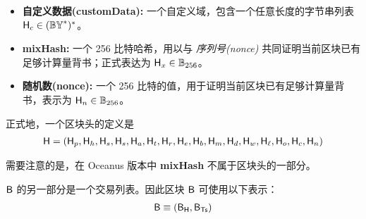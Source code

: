 \begin{itemize}[nosep]
	\item {\bf 自定义数据(customData):} 一个自定义域，包含一个任意长度的字节串列表 $\textsf{H}_c\in (\mathbb{BY}^*)^*$。

	\item {\bf mixHash:} 一个 256 比特哈希，用以与 \emph{序列号(nonce)} 共同证明当前区块已有足够计算量背书；正式表达为 $\textsf{H}_x\in\mathbb{B}_{256}$。

	\item {\bf 随机数(nonce):} 一个 256 比特的值，用于证明当前区块已有足够计算量背书，表示为 $\textsf{H}_n\in\mathbb{B}_{256}$。


\end{itemize}

正式地，一个区块头的定义是
%
\begin{align}
	\textsf{H} = (\textsf{H}_p,\textsf{H}_h,\textsf{H}_s,\textsf{H}_s,\textsf{H}_a,\textsf{H}_t,\textsf{H}_r,\textsf{H}_e,\textsf{H}_b,\textsf{H}_m,\textsf{H}_d,\textsf{H}_w,\textsf{H}_\ell,\textsf{H}_o,\textsf{H}_c,\textsf{H}_n)
\end{align}

需要注意的是，在 Oceanus 版本中 {\bf mixHash} 不属于区块头的一部分。

$\textsf{B}$ 的另一部分是一个交易列表。因此区块 $\textsf{B}$ 可使用以下表示：  
\begin{align}
	\textsf{B}\equiv \left(\textsf{B}_{\textsf{H}}, \textsf{B}_{\textsf{Ts}} \right)
\end{align}


